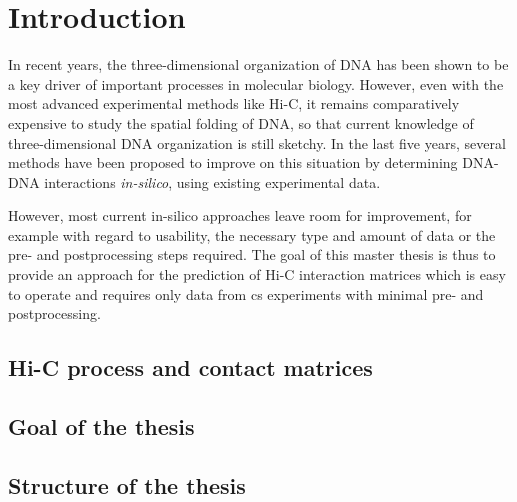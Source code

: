 \section{Introduction}
In recent years, the three-dimensional organization of DNA has been shown to 
be a key driver of important processes in molecular biology.
However, even with the most advanced experimental methods like Hi-C, 
it remains comparatively expensive to study the spatial folding of DNA,
so that current knowledge of three-dimensional DNA organization is still sketchy.
In the last five years, several methods have been proposed to improve on this situation
by determining DNA-DNA interactions \emph{in-silico}, using existing experimental data.

However, most current in-silico approaches leave room for improvement, for example with regard to usability, the necessary type and amount of data or the pre- and postprocessing steps required.
The goal of this master thesis is thus to provide an approach for the prediction of Hi-C interaction matrices which is easy to operate and requires only data from \acrshort{cs}
experiments with minimal pre- and postprocessing.

\subsection{Hi-C process and contact matrices}
\subsection{Goal of the thesis}
\subsection{Structure of the thesis}
